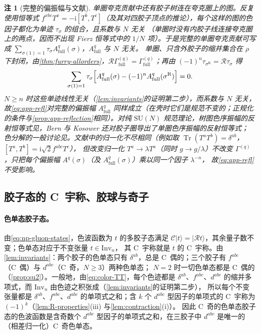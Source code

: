 \documentclass[UTF8,a4paper,11pt,fontset=fandol]{ctexart}
\theoremstyle{cplain}
\theoremstyle{cdefinition}
\theoremstyle{cremark}
\newtheorem{remark}[theorem]{注}
\numberwithin{equation}{section}
\DeclareMathOperator{\Tr}{Tr}
\newcommand{\Cop}{\mathcal{C}}                       %
\newcommand{\Rop}{\mathcal{R}}                       %
\newcommand{\ii}{\mathrm{i}}                        %
\begin{document}
\begin{remark}[完整的偏振幅与文献]\label{rem:app-refl-full}
单圈夸克贡献中还有胶子树连在夸克圈上的图。反复使用恒等式 $f^{xbc}T^x=-\ii[T^b,T^c]$（及其对四胶子顶点的推论），每个这样的图的色因子都化为单迹 $\tau_\sigma$ 的组合，且系数与 $N$ 无关
（单圈时没有内胶子线连接夸克圈上的两点，因而不出现 Fierz 恒等式中的 $1/N$ 项）。于是完整的单圈夸克贡献可写成 $\sum_{\sigma(1)=1}\tau_\sigma A^q_{\mathrm{full}}(\sigma)$，$A^q_{\mathrm{full}}$ 与 $N$ 无关。
单圈、只含外胶子的缩并集合在 $\rho$ 下封闭，由\cref{thm:furry-allorders}，$\Rop\Gamma^{(q)}_{\mathrm{full}}=\Gamma^{(q)}_{\mathrm{full}}$；再由 $(-1)^n\tau_{\sigma^{\mathrm R}}=\Rop\tau_\sigma$ 得
\begin{equation*}
\sum_{\sigma(1)=1}\tau_\sigma\Bigl[A^q_{\mathrm{full}}(\sigma)-(-1)^nA^q_{\mathrm{full}}(\sigma^{\mathrm R})\Bigr]=0 .
\end{equation*}
$N\ge n$ 时这些单迹线性无关（\cref{lem:invariants}的证明第二步），而系数与 $N$ 无关，
故\cref{eq:app-refl}对完整的偏振幅 $A^q_{\mathrm{full}}$ 同样成立（在壳时它们是规范不变的；正规化的条件与\cref{prop:app-reflection}相同）。对纯 $\mathrm{SU}(N)$ 规范理论，树图色序振幅的反射恒等式见\cite{BernKosower1991,ManganoParke1991}，Bern 与 Kosower 还对胶子圈导出了单圈色序振幅的反射恒等式\cite{BernKosower1991}；
色分解的一般讨论见\cite{ManganoParke1991,Dixon1996TASI}。文献中的归一化不尽相同（例如\cite{Dixon1996TASI}取 $\Tr(T^aT^b)=\delta^{ab}$，$[T^a,T^b]=\ii\sqrt2f^{abc}T^c$），
但改变归一化 $T^a\to\lambda T^a$（同时 $g\to g/\lambda$）不改变 $\Gamma^{(q)}$，只把每个偏振幅 $A^q(\sigma)$（及 $A^q_{\mathrm{full}}(\sigma)$）乘以同一个因子 $\lambda^{-n}$，
故\cref{eq:app-refl}不受影响。
\end{remark}

\subsection{胶子态的 C~宇称、胶球与奇子}\label{sec:applications-glue}

\paragraph{色单态胶子态。}由\cref{eq:np-gluon-states}，色波函数为 $t$ 的多胶子态满足 $\Cop|t\rangle=|\Rop t\rangle$，其余量子数不变；色单态对应于不变张量 $t\in\mathrm{Inv}_n$，
其 C~宇称就是 $t$ 的 C~宇称。由\cref{lem:invariants}：两个胶子的色单态只有 $\delta^{ab}$，总是 C~偶的；三个胶子有 $f^{abc}$（C~偶）与 $d^{abc}$（C~奇，$N\ge3$）两种色单态\cite{Ewerz2003}；
$N=2$ 时一切色单态都是 C~偶的（\cref{prop:su2}）。一般地，由\cref{eq:color-TT}，每个色迹都是 $\delta^{ab}$、$f^{abc}$、$d^{abc}$ 的缩并多项式，而 $\mathrm{Inv}_n$ 由色迹之积张成（\cref{lem:invariants}的证明第二步），
所以每个不变张量都是 $\delta^{ab}$、$f^{abc}$、$d^{abc}$ 的单项式之和；含 $k$ 个 $d^{abc}$ 型因子的单项式的 C~宇称为 $(-1)^k$（\cref{lem:R-properties}(iii) 与\cref{lem:contraction}(i)）。
因此 C~奇的色单态胶子态的色波函数是含奇数个 $d^{abc}$ 型因子的单项式之和，在三胶子中 $d^{abc}$ 是唯一的（相差归一化）C~奇色单态。
\end{document}
